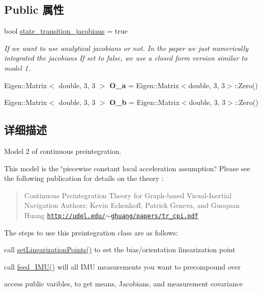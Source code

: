 \subsection*{Public 属性}
\begin{DoxyCompactItemize}
\item 
\mbox{\label{classov__core_1_1CpiV2_ab024c0b2d090de85e40c6c80d6bb04c3}} 
bool \hyperlink{classov__core_1_1CpiV2_ab024c0b2d090de85e40c6c80d6bb04c3}{state\+\_\+transition\+\_\+jacobians} = true
\begin{DoxyCompactList}\small\item\em If we want to use analytical jacobians or not. In the paper we just numerically integrated the jacobians If set to false, we use a closed form version similar to model 1. \end{DoxyCompactList}\item 
\mbox{\label{classov__core_1_1CpiV2_a71af3328f6ffb888c4b65139a1acdf6b}} 
Eigen\+::\+Matrix$<$ double, 3, 3 $>$ {\bfseries O\+\_\+a} = Eigen\+::\+Matrix$<$double, 3, 3$>$\+::Zero()
\item 
\mbox{\label{classov__core_1_1CpiV2_a08f8adcd49de5092c56120d83d913749}} 
Eigen\+::\+Matrix$<$ double, 3, 3 $>$ {\bfseries O\+\_\+b} = Eigen\+::\+Matrix$<$double, 3, 3$>$\+::Zero()
\end{DoxyCompactItemize}


\subsection{详细描述}
Model 2 of continuous preintegration. 

This model is the \char`\"{}piecewise constant local acceleration assumption.\char`\"{} Please see the following publication for details on the theory \cite{Eckenhoff2019IJRR} \+: \begin{quote}
Continuous Preintegration Theory for Graph-\/based Visual-\/\+Inertial Navigation Authors\+: Kevin Eckenhoff, Patrick Geneva, and Guoquan Huang \href{http://udel.edu/~ghuang/papers/tr_cpi.pdf}{\tt http\+://udel.\+edu/$\sim$ghuang/papers/tr\+\_\+cpi.\+pdf} \end{quote}


The steps to use this preintegration class are as follows\+:
\begin{DoxyEnumerate}
\item call \hyperlink{classov__core_1_1CpiBase_a32c11e3e61dc8a524bf48a18504b5417}{set\+Linearization\+Points()} to set the bias/orientation linearization point
\item call \hyperlink{classov__core_1_1CpiV2_a2e526d34b80061293a922fefa3a858a1}{feed\+\_\+\+I\+M\+U()} will all I\+MU measurements you want to precompound over
\item access public varibles, to get means, Jacobians, and measurement covariance 
\end{DoxyEnumerate}


